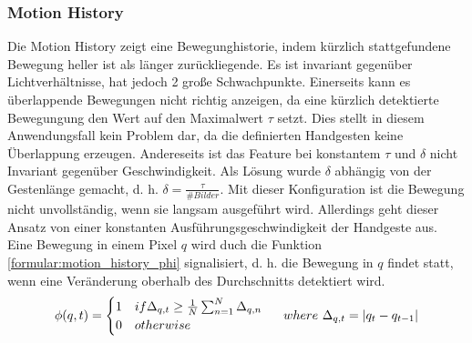 \subsubsection{Motion History}
Die Motion History zeigt eine Bewegunghistorie, indem kürzlich stattgefundene Bewegung heller ist als länger zurückliegende. Es ist invariant gegenüber Lichtverhältnisse, hat jedoch 2 große Schwachpunkte.
Einerseits kann es überlappende Bewegungen nicht richtig anzeigen, da eine kürzlich detektierte Bewegungung den Wert auf den Maximalwert $\tau$ setzt. Dies stellt in diesem Anwendungsfall kein
Problem dar, da die definierten Handgesten keine Überlappung erzeugen.
\newline
\newline
Andereseits ist das Feature bei konstantem $\tau$ und $\delta$ nicht Invariant gegenüber Geschwindigkeit. Als Lösung wurde $\delta$ abhängig von der Gestenlänge gemacht,
d. h. $\delta = \frac{\tau}{\#Bilder}$. Mit dieser Konfiguration ist die Bewegung nicht unvollständig, wenn sie langsam ausgeführt wird. Allerdings geht dieser Ansatz von einer konstanten
Ausführungsgeschwindigkeit der Handgeste aus.
\newline
\newline
Eine Bewegung in einem Pixel $q$ wird duch die Funktion \ref{formular:motion_history_phi} signalisiert, d. h. die Bewegung in $q$ findet statt, wenn eine Veränderung oberhalb des Durchschnitts detektiert wird.
\begin{align}
    \phi(q,t) = \begin{cases}
                    1 & if \Delta_{q,t} \geq \frac{1}{N} \sum_{n=1}^N \Delta_{q,n} \\
                    0 & otherwise
    \end{cases}
    \hspace{0.5cm}where\ \Delta_{q,t} = |q_t - q_{t-1}|
    \label{formular:motion_history_phi}
\end{align}

